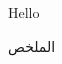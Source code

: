 ﻿\documentclass{article}
\begin{document}
Hello
\begin{otherlanguage}{arabic}
الملخص
\end{otherlanguage}
\end{document}
